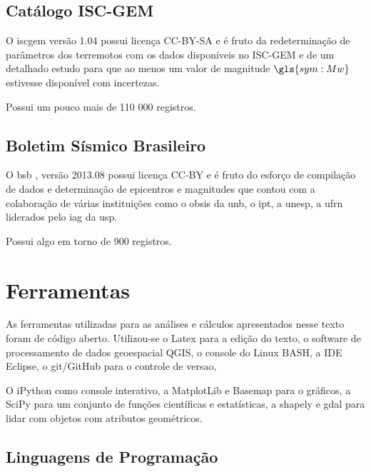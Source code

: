 \subsection{Catálogo ISC-GEM}
\label{sec:data_source}

O \glsdesc{iscgem} versão 1.04 possui licença CC-BY-SA e é fruto da redeterminação de parâmetros
dos terremotos com os dados disponíveis no ISC-GEM e de um detalhado estudo para que ao menos um valor de
magnitude $\gls{sym:Mw}$ estivesse disponível com incertezas.

Possui um pouco mais de 110 000 registros.  

\subsection{Boletim Sísmico Brasileiro}
\label{sec:data_source2}

O \glsdesc{bsb} \citep{bsb_2013}, versão 2013.08 possui licença CC-BY e é fruto do esforço de compilação de
dados e determinação de epicentros e magnitudes que contou com a colaboração de várias instituições
como o \gls{obsis} da \gls{unb}, o \gls{ipt}, a \gls{unesp}, a \gls{ufrn} liderados pelo \gls{iag} da \gls{usp}.


Possui algo em torno de 900 registros.


\section{Ferramentas}
\label{sec:ferramentas}

As ferramentas utilizadas para as análises e cálculos apresentados nesse texto
foram de código aberto.
Utilizou-se o Latex para a edição do texto, o software de processamento de dados
geoespacial QGIS, o console do Linux BASH, a IDE Eclipse, o git/GitHub para o controle de versao,

O iPython como console interativo, a MatplotLib e Basemap para o gráficos, 
a SciPy para um conjunto de funções científicas e estatísticas, a shapely e gdal
para lidar com objetos com atributos geométricos.


\subsection{Linguagens de Programação}
\label{sec:linguagens}

